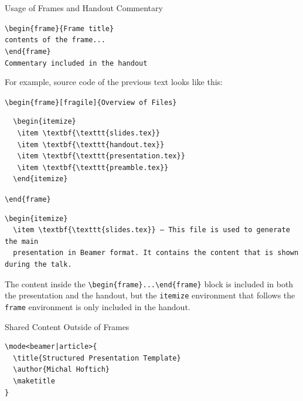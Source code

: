 \begin{frame}[fragile]{Usage of Frames and Handout Commentary}

\begin{likeverbatim}  
  \verb|\begin{frame}{Frame title}|\\
  \verb|contents of the frame...|\\
  \verb|\end|\verb|{frame}|\\
  \vspace{1em}
  \verb|Commentary included in the handout|
\end{likeverbatim}

\end{frame}

For example, source code of the previous text looks like this:

\verb|\begin|\verb|{frame}[fragile]{Overview of Files}|
\begin{verbatim}
  \begin{itemize}
   \item \textbf{\texttt{slides.tex}} 
   \item \textbf{\texttt{handout.tex}}
   \item \textbf{\texttt{presentation.tex}}
   \item \textbf{\texttt{preamble.tex}}
  \end{itemize}
\end{verbatim}
\verb|\end|\verb|{frame}|
\begin{verbatim}
\begin{itemize}
  \item \textbf{\texttt{slides.tex}} – This file is used to generate the main 
  presentation in Beamer format. It contains the content that is shown during the talk.
\end{verbatim}

The content inside the \verb|\begin|\verb|{frame}...\end|\verb|{frame}| block is included in both
the presentation and the handout, but the \texttt{itemize} environment that follows
the \verb|frame| environment is only included in the handout.


\begin{frame}[fragile]{Shared Content Outside of Frames}

\begin{verbatim}
\mode<beamer|article>{
  \title{Structured Presentation Template}
  \author{Michal Hoftich}
  \maketitle
}
  
\end{verbatim}
\end{frame}

